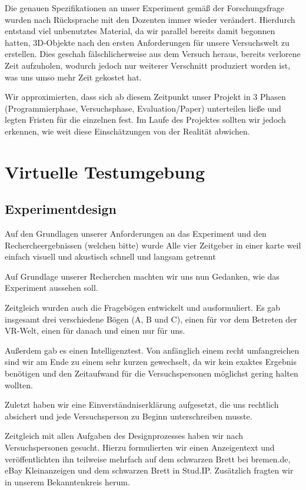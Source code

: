 \documentclass{Bericht}
\begin{document}
		Die genauen Spezifikationen an unser Experiment gemäß der Forschungsfrage wurden nach Rücksprache mit den Dozenten immer wieder verändert. Hierdurch entstand viel unbenutztes Material, da wir parallel bereits damit begonnen hatten, 3D-Objekte nach den ersten Anforderungen für unsere Versuchswelt zu erstellen. Dies geschah fälschlicherweise aus dem Versuch heraus, bereits verlorene Zeit aufzuholen, wodurch jedoch nur weiterer Verschnitt produziert worden ist, was uns umso mehr Zeit gekostet hat.

		Wir approximierten, dass sich ab diesem Zeitpunkt unser Projekt in 3 Phasen (Programmierphase, Versuchsphase, Evaluation/Paper) unterteilen ließe und legten Fristen für die einzelnen fest. Im Laufe des Projektes sollten wir jedoch erkennen, wie weit diese Einschätzungen von der Realität abwichen.


\section{Virtuelle Testumgebung}

\subsection{Experimentdesign}

Auf den Grundlagen unserer Anforderungen an das Experiment und den Rechercheergebnissen (welchen bitte) wurde 
Alle vier Zeitgeber in einer karte weil einfach
visuell und akustisch schnell und langsam getrennt 
 

		Auf Grundlage unserer Recherchen machten wir uns nun Gedanken, wie das Experiment aussehen soll. 
		
		Zeitgleich wurden auch die Fragebögen entwickelt und ausformuliert. Es gab insgesamt drei verschiedene Bögen (A, B und C), einen für vor dem Betreten der VR-Welt, einen für danach und einen nur für uns.
			
		Außerdem gab es einen Intelligenztest. Von anfänglich einem recht umfangreichen sind wir am Ende zu einem sehr kurzen gewechselt, da wir kein exaktes Ergebnis benötigen und den Zeitaufwand für die Versuchspersonen möglichst gering halten wollten.
			
		Zuletzt haben wir eine Einverständniserklärung aufgesetzt, die uns rechtlich absichert und jede Versuchsperson zu Beginn unterschreiben musste.
			
		Zeitgleich mit allen Aufgaben des Designprozesses haben wir nach Versuchspersonen gesucht. Hierzu formulierten wir einen Anzeigentext und veröffentlichten ihn teilweise mehrfach auf dem schwarzen Brett bei bremen.de, eBay Kleinanzeigen und dem schwarzen Brett in Stud.IP. Zusätzlich fragten wir in unserem Bekanntenkreis herum. 
			
\end{document}
